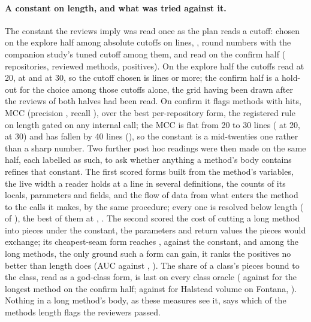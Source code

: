 \documentclass[11pt,a4paper]{article}
\begin{document}
\paragraph{A constant on length, and what was tried against it.} The
constant the reviews imply was read once as the plan reads a cutoff: chosen
on the explore half among \lwNlocGridCount{} absolute cutoffs on lines,
\lwNlocGrid{}, round numbers with the companion study's tuned cutoff among
them, and read on the confirm half (\lwConfirmRepos{} repositories,
\lwConfirmUnits{} reviewed methods, \lwConfirmPositives{} positives). On the
explore half the cutoffs read \lwExploreTwentyMcc{} at 20,
\lwExploreChosenMcc{} at \lwLengthCutoff{} and \lwExploreThirtyMcc{} at 30,
so the cutoff chosen is \lwLengthCutoff{} lines or more; the confirm half is
a hold-out for the choice among those cutoffs alone, the grid having been
drawn after the reviews of both halves had been read. On confirm it flags \lwLengthFlagged{} methods with
\lwLengthHits{} hits, MCC \lwLengthMccConfirm{} (precision
\lwLengthPrecision{}, recall \lwLengthRecall{}), \lwLengthVsRule{} over
the best per-repository form, the registered rule on length gated on any
internal call; the MCC is flat from 20 to 30 lines (\lwNlocTwentyMcc{} at
20, \lwNlocThirtyMcc{} at 30) and has fallen by 40 lines
(\lwNlocFortyMcc{}), so the constant is a mid-twenties one rather than a
sharp number. Two further post hoc readings were then made on the same
half, each labelled as such, to ask whether anything a method's body
contains refines that constant. The first scored \lwHeldOutForms{} forms
built from the method's variables, the live width a reader holds at a line
in several definitions, the counts of its locals, parameters and fields,
and the flow of data from what enters the method to the calls it makes, by
the same procedure; every one is resolved below length
(\lwFormsBelowLength{} of \lwHeldOutForms{}), the best of them at
\lwBestFormMcc{}, \lwBestFormVsLength{}. The second scored the cost of
cutting a long method into pieces under the constant, the parameters and
return values the pieces would exchange; its cheapest-seam form reaches
\splitCostMcc{}, \splitCostVsLength{} against the constant, and among the
\splitWithinN{} long methods, the only ground such a form can gain, it
ranks the \splitWithinPositives{} positives no better than length does (AUC
\splitCostAucWithin{} against \splitNlocAucWithin{}, \splitCostAucVsNloc{}).
The share of a class's pieces bound to the class, read as a god-class
form, is last on every class oracle (\splitLockedShareMcc{} against
\splitBlobLengthMcc{} for the longest method on the confirm half;
\splitFontanaLockedMcc{} against \splitFontanaHvolMcc{} for Halstead
volume on Fontana, \splitFontanaLockedVsHvol{}). Nothing in a long method's
body, as these measures see it, says which of the methods length flags the
reviewers passed.
\end{document}
